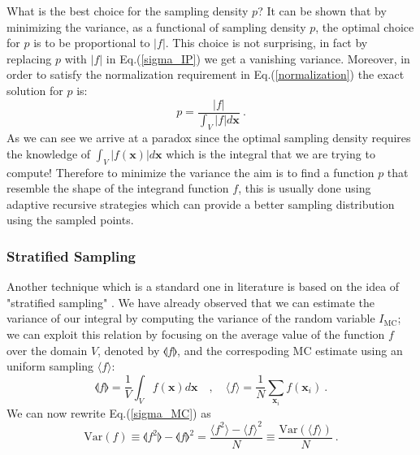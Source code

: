\documentclass[../main/main.tex]{subfiles}
\begin{document}
What is the best choice for the sampling density $p$?
It can be shown that by minimizing the variance, as a functional of sampling density $p$, the optimal choice for $p$ is to be proportional 
to $|f|$. This choice is not surprising, in fact by replacing $p$ with $|f|$ in Eq.(\ref{sigma_IP}) we get a vanishing variance.
Moreover, in order to satisfy the normalization requirement in Eq.(\ref{normalization}) the exact solution for $p$ is:
\begin{equation}
	p = \frac{|f|}{\int_V |f| d\textbf{x}} \ .
\end{equation}
\newline
As we can see we arrive at a paradox since the optimal sampling density requires the knowledge of $\int_V |f(\textbf{x})| d\textbf{x}$ which is the integral that we are trying to compute!
\newline
Therefore to minimize the variance the aim is to find a function $p$ that resemble the shape of the integrand function $f$, this is usually done 
using adaptive recursive strategies which can provide a better sampling distribution using the sampled points.
\subsubsection{Stratified Sampling}
Another technique which is a standard one in literature is based on the idea of  "stratified sampling" \cite{Press:1989vk, Press:1992zz}.
We have already observed that we can estimate the variance of our integral by computing the variance of the random variable $I_{\text{MC}}$; we can exploit this relation by focusing on the average value of the function $f$ over the domain $V$, denoted by $\llangle  f \rrangle $, and the correspoding MC estimate using an uniform sampling $ \langle f \rangle$:
\begin{equation}
	\llangle  f \rrangle = \frac{1}{V} \int_V f(\textbf{x}) d\textbf{x} \quad ,  \quad 
	\langle f \rangle = \frac{1}{N} \sum_{\textbf{x}_i} f(\textbf{x}_i) \ .
\end{equation}
We can now rewrite Eq.(\ref{sigma_MC}) as  
\begin{equation}
	\text{Var}( f ) \equiv \llangle f^2 \rrangle - \llangle f \rrangle ^2 = \frac{\langle f^2 \rangle - \langle f \rangle^2}{N} \equiv \frac{\text{Var}(\langle f \rangle )}{N} \ .
\end{equation}
\end{document}

